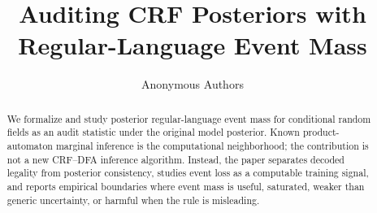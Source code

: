 \documentclass[11pt]{article}
\title{Auditing CRF Posteriors with Regular-Language Event Mass}
\author{Anonymous Authors}
\date{}
\begin{document}
\maketitle

\begin{abstract}
We formalize and study posterior regular-language event mass for conditional
random fields as an audit statistic under the original model posterior.
Known product-automaton marginal inference is the computational neighborhood;
the contribution is not a new CRF--DFA inference algorithm.  Instead, the paper
separates decoded legality from posterior consistency, studies event loss as a
computable training signal, and reports empirical boundaries where event mass is
useful, saturated, weaker than generic uncertainty, or harmful when the rule is
misleading.
\end{abstract}













\appendix

\end{document}

